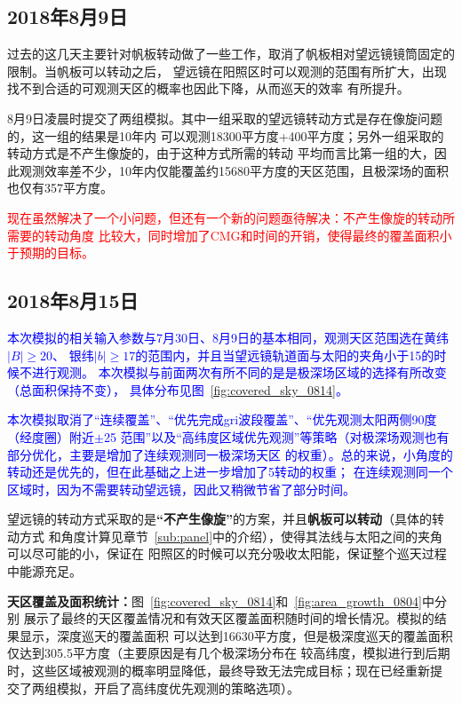 \documentclass[a4paper,11pt]{ctexart}
\newcommand{\RT}[1]{\textcolor{red}{#1}}
\newcommand{\BT}[1]{\textcolor{blue}{#1}}
\begin{document}
\subsection{2018年8月9日}
过去的这几天主要针对帆板转动做了一些工作，取消了帆板相对望远镜镜筒固定的限制。当帆板可以转动之后，
望远镜在阳照区时可以观测的范围有所扩大，出现找不到合适的可观测天区的概率也因此下降，从而巡天的效率
有所提升。


8月9日凌晨时提交了两组模拟。其中一组采取的望远镜转动方式是存在像旋问题的，这一组的结果是10年内
可以观测18300平方度+400平方度；另外一组采取的转动方式是不产生像旋的，由于这种方式所需的转动
平均而言比第一组的大，因此观测效率差不少，10年内仅能覆盖约15680平方度的天区范围，且极深场的面积
也仅有357平方度。


\RT{\heiti 现在虽然解决了一个小问题，但还有一个新的问题亟待解决：不产生像旋的转动所需要的转动角度
比较大，同时增加了CMG和时间的开销，使得最终的覆盖面积小于预期的目标。}


\subsection{2018年8月15日}
\BT{本次模拟的相关输入参数与7月30日、8月9日的基本相同，观测天区范围选在黄纬$|B|\ge 20$\textdegree 、
银纬$|b|\ge 17$\textdegree 的范围内，并且当望远镜轨道面与太阳的夹角小于15\textdegree 的时候不进行观测。
本次模拟与前面两次有所不同的是是极深场区域的选择有所改变（总面积保持不变），
具体分布见图~\ref{fig:covered_sky_0814}。}

\BT{本次模拟取消了“连续覆盖”、“优先完成gri波段覆盖”、“优先观测太阳两侧90度（经度圈）附近$\pm$25\textdegree
范围”以及“高纬度区域优先观测”等策略（对极深场观测也有部分优化，主要是增加了连续观测同一极深场天区
的权重）。总的来说，小角度的转动还是优先的，但在此基础之上进一步增加了5\textdegree 转动的权重；
在连续观测同一个区域时，因为不需要转动望远镜，因此又稍微节省了部分时间。}

望远镜的转动方式采取的是\textbf{“不产生像旋”}的方案，并且\textbf{帆板可以转动}（具体的转动方式
和角度计算见章节~\ref{sub:panel}中的介绍），使得其法线与太阳之间的夹角可以尽可能的小，保证在
阳照区的时候可以充分吸收太阳能，保证整个巡天过程中能源充足。

\textbf{天区覆盖及面积统计：}图~\ref{fig:covered_sky_0814}和~\ref{fig:area_growth_0804}中分别
展示了最终的天区覆盖情况和有效天区覆盖面积随时间的增长情况。模拟的结果显示，深度巡天的覆盖面积
可以达到16630平方度，但是极深度巡天的覆盖面积仅达到305.5平方度（主要原因是有几个极深场分布在
较高纬度，模拟进行到后期时，这些区域被观测的概率明显降低，最终导致无法完成目标；现在已经重新提
交了两组模拟，开启了高纬度优先观测的策略选项）。
\end{document}
